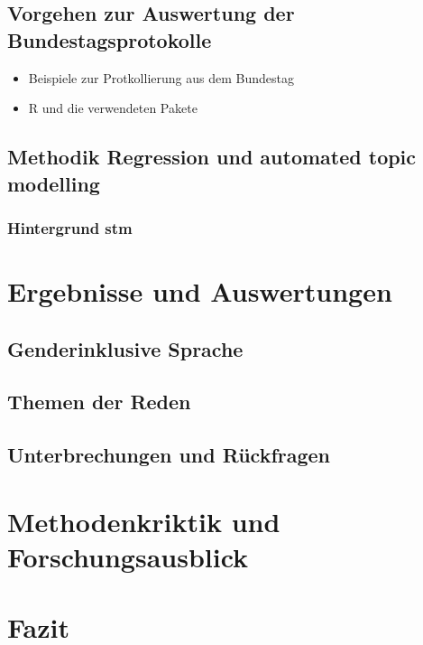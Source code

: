 \documentclass[12pt, 
    twoside=false, 
    bibliography=totoc, 
    numbers=endperiod, 
    headings=normal, 
    toc=chapterentrydotfill
    ]{scrbook}
\begin{document}
\section{Vorgehen zur Auswertung der Bundestagsprotokolle}
\begin{itemize}
    \item Beispiele zur Protkollierung aus dem Bundestag
    \item R und die verwendeten Pakete
\end{itemize}

\section{Methodik Regression und automated topic modelling}

\subsection{Hintergrund stm}

\chapter{Ergebnisse und Auswertungen}

\section{Genderinklusive Sprache}

\section{Themen der Reden}

\section{Unterbrechungen und Rückfragen}

\chapter{Methodenkriktik und Forschungsausblick}

\chapter{Fazit}

\printbibliography[title={Literaturverzeichnis}]
\end{document}
